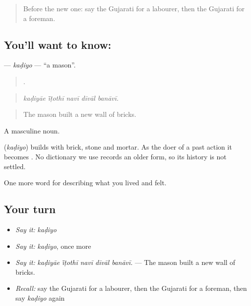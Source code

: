 \label{lesson:GU-C511-kadiyo}



\begin{quote}
Before the new one: say the Gujarati for a labourer, then the Gujarati for a foreman.
\end{quote}

\subsection*{You'll want to know: }
\textbf{} — \emph{kaḍiyo} — \textquotedblleft{}a mason\textquotedblright{}.

\begin{quote}
    .
\end{quote}

\begin{quote}
\emph{kaḍiyāe ī̃ṭothī navī dīvāl banāvī.}
\end{quote}

\begin{quote}
The mason built a new wall of bricks.
\end{quote}

A masculine noun.

\begin{cousinweb}
\textbf{} (\emph{kaḍiyo}) builds with brick, stone and mortar. As the doer of a past action it becomes \textbf{}. No dictionary we use records an older form, so its history is not settled.
\end{cousinweb}

\begin{grammarlens}[title={What you've built}]
One more word for describing what you lived and felt.
\end{grammarlens}

\subsection*{Your turn}
\begin{itemize}
\raggedright
  \item \emph{Say it:} \emph{kaḍiyo}
  \item \emph{Say it:} \emph{kaḍiyo}, once more
  \item \emph{Say it:} \emph{kaḍiyāe ī̃ṭothī navī dīvāl banāvī.} — The mason built a new wall of bricks.
  \item \emph{Recall:} say the Gujarati for a labourer, then the Gujarati for a foreman, then say \emph{kaḍiyo} again
\end{itemize}

